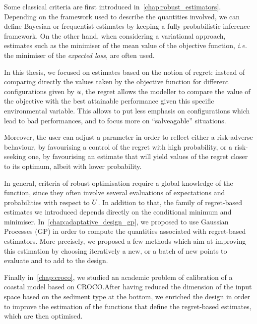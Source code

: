 \documentclass[../../Main_ManuscritThese.tex]{subfiles}
\begin{document}
Some classical criteria are first introduced
in~\cref{chap:robust_estimators}. Depending on the framework used to
describe the quantities involved, we can define Bayesian or
frequentist estimates by keeping a fully probabilistic inference
framework. On the other hand, when considering a variational approach,
estimates such as the minimiser of the mean value of the objective
function, \emph{i.e.} the minimiser of the \emph{expected loss}, are
often used.

In this thesis, we focused on estimates based on the notion of regret:
instead of comparing directly the values taken by the objective
function for different configurations given by $u$, the regret
allows the modeller to compare the value of the objective with the
best attainable performance given this specific environmental
variable.  This allows to put less emphasis on configurations which
lead to bad performances, and to focus more on ``salveagable''
situations.

Moreover, the user can adjust a parameter in order to reflect either a
risk-adverse behaviour, by favourising a control of the regret with
high probability, or a risk-seeking one, by favourising an estimate
that will yield values of the regret closer to its optimum, albeit
with lower probability.


In general, criteria of robust optimisation require a global knowledge
of the function, since they often involve several evaluations of
expectations and probabilities with respect to $U$. In addition to
that, the family of regret-based estimates we introduced depends
directly on the conditional minimum and
minimiser. In~\cref{chap:adaptative_design_gp}, we proposed to use
Gaussian Processes (GP) in order to compute the quantities associated
with regret-based estimators. More precisely, we proposed a few
methods which aim at improving this estimation by choosing iteratively
a new, or a batch of new points to evaluate and to add to the design.

Finally in~\cref{chap:croco}, we studied an academic problem of
calibration of a coastal model based on CROCO.\@ After having reduced
the dimension of the input space based on the sediment type at the
bottom, we enriched the design in order to improve the estimation of
the functions that define the regret-based estimates, which are then
optimised.
\end{document}
